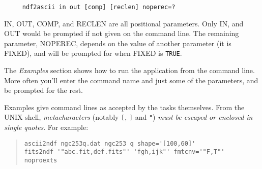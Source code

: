 \documentclass[twoside,11pt]{article}
\begin{document}
\begin{verbatim}
     ndf2ascii in out [comp] [reclen] noperec=?
\end{verbatim}
\normalsize
\smallskip

IN, OUT, COMP, and RECLEN are all positional
parameters.  Only IN, and OUT would be prompted if not given
on the command line. The remaining parameter, NOPEREC, depends on the
value of another parameter (it is FIXED), and will be prompted for when
FIXED is \texttt{TRUE}. 

The {\em Examples\/} section  \label{app_example}
shows how to run the application from the command line.  More often
you'll enter the command name and just some of the parameters, and be
prompted for the rest. 

Examples give command lines as accepted by the tasks themselves.  From
the UNIX shell, {\em metacharacters\/} (notably \texttt{[}, \texttt{]} and
\texttt{"})
{\em must be escaped or enclosed in single quotes}.  For example:

\begin{quote} \begin{verbatim}
ascii2ndf ngc253q.dat ngc253 q shape='[100,60]'
fits2ndf '"abc.fit,def.fits"' 'fgh,ijk"' fmtcnv='"F,T"' noproexts
\end{verbatim} \end{quote}
\normalsize
\end{document}
